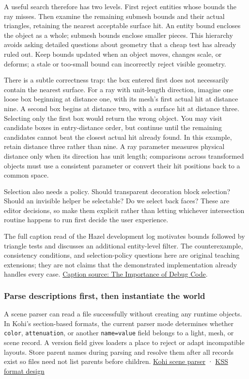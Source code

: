 A useful search therefore has two levels. First reject entities whose bounds the ray misses. Then examine the remaining submesh bounds and their actual triangles, retaining the nearest acceptable surface hit. An entity bound encloses the object as a whole; submesh bounds enclose smaller pieces. This hierarchy avoids asking detailed questions about geometry that a cheap test has already ruled out. Keep bounds updated when an object moves, changes scale, or deforms; a stale or too-small bound can incorrectly reject visible geometry.

There is a subtle correctness trap: the box entered first does not necessarily contain the nearest surface. For a ray with unit-length direction, imagine one loose box beginning at distance one, with its mesh's first actual hit at distance nine. A second box begins at distance two, with a surface hit at distance three. Selecting only the first box would return the wrong object. You may visit candidate boxes in entry-distance order, but continue until the remaining candidates cannot beat the closest actual hit already found. In this example, retain distance three rather than nine. A ray parameter measures physical distance only when its direction has unit length; comparisons across transformed objects must use a consistent parameter or convert their hit positions back to a common space.

Selection also needs a policy. Should transparent decoration block selection? Should an invisible helper be selectable? Do we select back faces? These are editor decisions, so make them explicit rather than letting whichever intersection routine happens to run first decide the user experience.

The full caption read of the Hazel development log motivates bounds followed by triangle tests and discusses an additional entity-level filter. The counterexample, consistency conditions, and selection-policy questions here are original teaching extensions; they are not claims that the demonstrated implementation already handles every case. \href{https://www.youtube.com/watch?v=mdJtdKA6H4s}{Caption source: The Importance of Debug Code}.

\subsubsection{Parse descriptions first, then instantiate the world}\label{06-engine-ii-ch032-parse-descriptions-first-then-instantiate-the-world}

A scene parser can read a file successfully without creating any runtime objects. In Kohi's section-based formats, the current parser mode determines whether \texttt{color}, \texttt{attenuation}, or another \texttt{name=value} field belongs to a light, mesh, or scene record. A version field gives loaders a place to reject or adapt incompatible layouts. Store parent names during parsing and resolve them after all records exist so files need not list parents before children. \href{https://www.youtube.com/watch?v=q8AfndGO-Ms}{Kohi scene parser} · \href{https://www.youtube.com/watch?v=tjQWdtn9FgY}{KSS format design}

